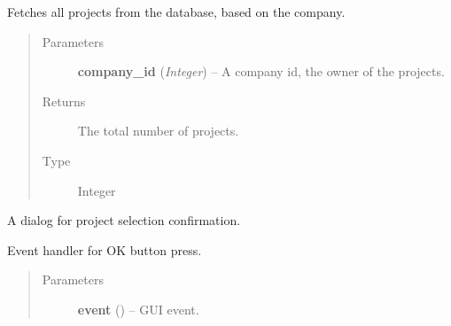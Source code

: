 \documentclass[letterpaper,10pt,english]{sphinxmanual}
\begin{document}
\begin{fulllineitems}

\begin{fulllineitems}
\label{dialogs:dialogs.ProjectSelectDialog.UpdateProjects}
Fetches all projects from the database, based on the company.
\begin{quote}\begin{description}
\item[{Parameters}] \leavevmode
\textbf{company\_id} (\emph{Integer}) -- A company id, the owner of the projects.

\item[{Returns}] \leavevmode
The total number of projects.

\item[{Type }] \leavevmode
Integer

\end{description}\end{quote}

\end{fulllineitems}


\end{fulllineitems}


\begin{fulllineitems}
\label{dialogs:dialogs.ProjectSelectedDialog}
A dialog for project selection confirmation.

\begin{fulllineitems}
\label{dialogs:dialogs.ProjectSelectedDialog.OnOk}
Event handler for OK button press.
\begin{quote}\begin{description}
\item[{Parameters}] \leavevmode
\textbf{event} () -- GUI event.

\end{description}\end{quote}

\end{fulllineitems}


\end{fulllineitems}
\end{document}
